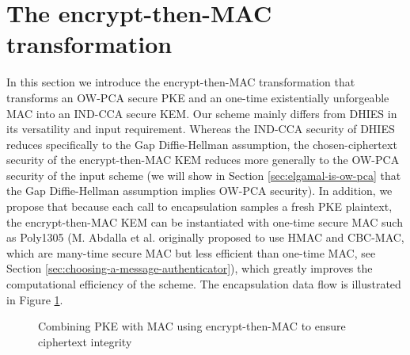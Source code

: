 \documentclass[journal=tches,submission]{iacrtrans}
\newcommand{\mac}{\texttt{MAC}}
\newcommand{\pk}{\texttt{pk}}
\newcommand{\leftsample}{\stackrel{\$}{\leftarrow}}
\begin{document}
\section{The encrypt-then-MAC transformation}\label{sec:main-results}
In this section we introduce the encrypt-then-MAC transformation that transforms an OW-PCA secure PKE and an one-time existentially unforgeable MAC into an IND-CCA secure KEM. Our scheme mainly differs from DHIES in its versatility and input requirement. Whereas the IND-CCA security of DHIES reduces specifically to the Gap Diffie-Hellman assumption, the chosen-ciphertext security of the encrypt-then-MAC KEM reduces more generally to the OW-PCA security \cite{DBLP:conf/ctrsa/OkamotoP01} of the input scheme (we will show in Section \ref{sec:elgamal-is-ow-pca} that the Gap Diffie-Hellman assumption implies OW-PCA security). In addition, we propose that because each call to encapsulation samples a fresh PKE plaintext, the encrypt-then-MAC KEM can be instantiated with one-time secure MAC such as Poly1305 (M. Abdalla et al. originally proposed to use HMAC and CBC-MAC, which are many-time secure MAC but less efficient than one-time MAC, see Section \ref{sec:choosing-a-message-authenticator}), which greatly improves the computational efficiency of the scheme. The encapsulation data flow is illustrated in Figure \ref{fig:etm-diagram}.

\begin{figure}[h]
    \centering

    \caption{Combining PKE with MAC using encrypt-then-MAC to ensure ciphertext integrity}\label{fig:etm-diagram}
\end{figure}
\end{document}

